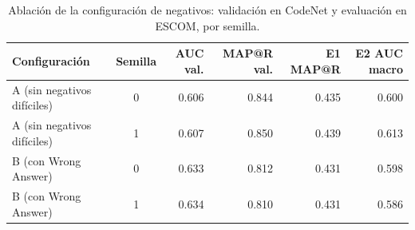 \begin{table}[H]
\centering
\small
\begin{tabular}{|l|c|r|r|r|r|}
\hline
\textbf{Configuración} & \textbf{Semilla} & \textbf{AUC val.} & \textbf{MAP@R val.} & \textbf{E1 MAP@R} & \textbf{E2 AUC macro} \\ \hline
A (sin negativos difíciles) & 0 & 0.606 & 0.844 & 0.435 & 0.600 \\ \hline
A (sin negativos difíciles) & 1 & 0.607 & 0.850 & 0.439 & 0.613 \\ \hline
B (con Wrong Answer) & 0 & 0.633 & 0.812 & 0.431 & 0.598 \\ \hline
B (con Wrong Answer) & 1 & 0.634 & 0.810 & 0.431 & 0.586 \\ \hline
\end{tabular}
\caption{Ablación de la configuración de negativos: validación en CodeNet y evaluación en ESCOM, por semilla.}
\label{tab:ablacion}
\end{table}
